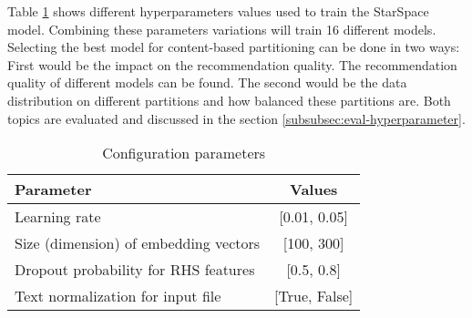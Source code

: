 Table \ref{tab:hyperparameter} shows different hyperparameters values used to train the StarSpace model. Combining these parameters variations will train 16 different models. Selecting the best model for content-based partitioning can be done in two ways: First would be the impact on the recommendation quality. The recommendation quality of different models can be found. The second would be the data distribution on different partitions and how balanced these partitions are. Both topics are evaluated and discussed in the section \ref{subsubsec:eval-hyperparameter}.


\begin{table}[!h]
	\centering
	\caption{Configuration parameters}
	\label{tab:hyperparameter}
	\begin{tabular}{|l|c|}
		\hline
		\textbf{Parameter} & \textbf{Values} \\
		\hline
		Learning rate & [0.01, 0.05] \\
		\hline
		Size (dimension) of embedding vectors & [100, 300] \\
		\hline
		Dropout probability for RHS features & [0.5, 0.8] \\
		\hline
		Text normalization for input file & [True, False]\\
		\hline
	\end{tabular}
\end{table}

